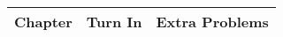 \documentclass[12pt]{article}
\begin{document}
\begin{center}
\begin{tabular}{|c|c||c|}
\hline
Chapter & Turn In & Extra Problems\\
\hline



%
%
%
%
%
%
%
%
%
%
%
%


\end{tabular}
\end{center}
\end{document}
